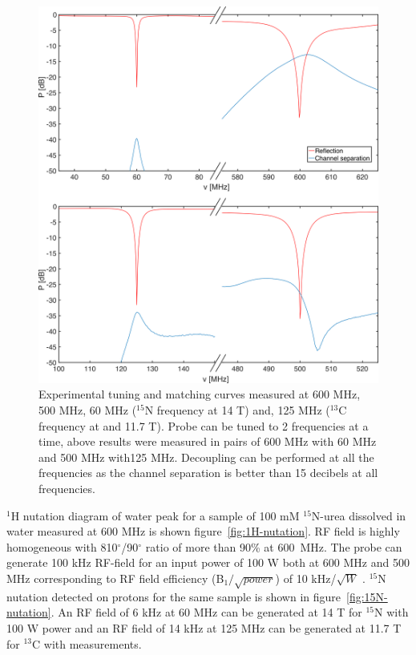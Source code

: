 \documentclass[preprint,12pt]{article}
\begin{document}
\begin{figure}
\centering
\includegraphics[width=.7\linewidth,keepaspectratio=true]{./figures/ms5n17-tlp-im-180710-tandm-sameaxis.png} 
\caption{Experimental tuning and matching curves measured at 600 MHz, 500 MHz, 60 MHz ($^{15}$N frequency at 14 T) and, 125 MHz ($^{13}$C frequency at  and 11.7 T). Probe can be tuned to 2 frequencies at a time, above results were measured in pairs of 600 MHz with 60 MHz and 500 MHz with125 MHz. Decoupling can be performed at all the frequencies as the channel separation is better than 15 decibels at all frequencies.}
\label{fig:tandm} 
\end{figure}
$^1$H nutation diagram of water peak for a sample of 100 mM $^{15}$N-urea dissolved in water measured at 600 MHz is shown figure~\ref{fig:1H-nutation}. RF field is highly homogeneous with 810$^{\circ}$/90$^{\circ}$ ratio of more than 90\% at 600~MHz. The probe can generate 100 kHz RF-field for an input power of 100 W both at 600 MHz and 500 MHz corresponding to RF field efficiency (B$_{1}/\sqrt{power}$) of 10 kHz/$\sqrt{W}$ . $^{15}$N nutation detected on protons for the same sample is shown in figure~\ref{fig:15N-nutation}. An RF field of 6 kHz at 60 MHz can be generated at 14 T for $^{15}$N with 100 W power and an RF field of 14 kHz at 125 MHz can be generated at 11.7 T for $^{13}$C with measurements.\par
\end{document}
